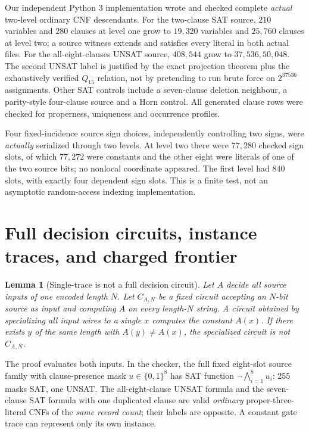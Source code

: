 \documentclass[11pt]{article}
\newtheorem{lemma}[theorem]{Lemma}
\begin{document}
Our independent Python 3 implementation wrote and checked
complete \emph{actual} two-level ordinary CNF descendants.
For the two-clause SAT source, \(210\) variables and \(280\)
clauses at level one grow to \(19{,}320\) variables and \(25{,}760\)
clauses at level two; a source witness extends and satisfies every
literal in both actual files. For the all-eight-clauses UNSAT
source, \(408,544\) grow to \(37{,}536,50{,}048\).
The second UNSAT label is justified by the exact projection
theorem plus the exhaustively verified \(Q_{15}\) relation, not
by pretending to run brute force on \(2^{37536}\) assignments.
Other SAT controls include a seven-clause deletion neighbour,
a parity-style four-clause source and a Horn control.
All generated clause rows were checked for properness, uniqueness
and occurrence profiles.

Four fixed-incidence source sign choices, independently controlling
two signs, were \emph{actually} serialized through two levels.
At level two there were \(77{,}280\) checked sign slots, of which
\(77{,}272\) were constants and the other eight were literals
of one of the two source bits; no nonlocal coordinate appeared.
The first level had \(840\) slots, with exactly four dependent
sign slots. This is a finite test, not an asymptotic random-access
indexing implementation.

\section{Full decision circuits, instance traces, and charged frontier}
\begin{lemma}[Single-trace is not a full decision circuit]
Let \(A\) decide all source inputs of one encoded length \(N\).
Let \(C_{A,N}\) be a fixed circuit accepting an \(N\)-bit source
as input and computing \(A\) on \emph{every} length-\(N\) string.
A circuit obtained by specializing all input wires to a single
\(x\) computes the constant \(A(x)\). If there exists \(y\) of the
same length with \(A(y)\ne A(x)\), the specialized circuit
is \emph{not} \(C_{A,N}\).
\end{lemma}
The proof evaluates both inputs. In the checker, the full
fixed eight-slot source family with clause-presence mask
\(u\in\{0,1\}^8\) has SAT function
\(\neg\bigwedge_{i=1}^8u_i\): 255 masks SAT, one UNSAT.
The all-eight-clause UNSAT formula and the seven-clause
SAT formula with one duplicated clause are valid \emph{ordinary}
proper-three-literal CNFs of the \emph{same record count};
their labels are opposite. A constant gate trace can
represent only its own instance.
\end{document}

